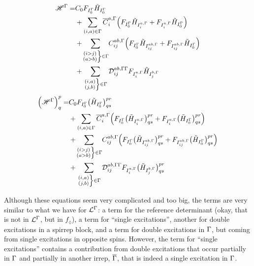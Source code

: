 \begin{equation}
  \begin{split}
    \bigH^\irp = &
    C_0 F_{I_0^\irp} \tilde{H}_{I_0^\irp}\\
    & + \sum_{(i,a) \in \irp} \overline{C}_i^{a,\irp}
    \Big(
        F_{I_0^\irp} \tilde{H}_{I_{i}^{a,\irp}}
        + F_{I_{i}^{a,\irp}} \tilde{H}_{I_0^\irp}
    \Big)\\
    & + \sumijabrestr C_{ij}^{ab, \irp}
    \Big(
        F_{I_0^\irp} \tilde{H}_{I_{ij}^{ab,\irp}}
        + F_{I_{ij}^{ab,\irp}} \tilde{H}_{I_0^\irp}
    \Big)\\
    & + \sumijabfull \Dmix_{ij}^{ab, \irp\irp}
    F_{I_i^{a,\irp}} \tilde{H}_{I_j^{b,\irp}}
  \end{split}
\end{equation}
\begin{equation}
  \begin{split}
    \Big( \bigH^\irp \Big)^p_q = &
    C_0 F_{I_0^\irp} \big( \tilde{H}_{I_0^\irp} \big)^{pr}_{qs}\\
    & + \sum_{(i,a) \in \irp} \overline{C}_i^{a,\irp}
    \Big(
        F_{I_0^\irp} \big( \tilde{H}_{I_{i}^{a,\irp}} \big)^{pr}_{qs}
        + F_{I_{i}^{a,\irp}} \big( \tilde{H}_{I_0^\irp} \big)^{pr}_{qs}
    \Big)\\
    & + \sumijabrestr C_{ij}^{ab, \irp}
    \Big(
        F_{I_0^\irp} \big( \tilde{H}_{I_{ij}^{ab,\irp}} \big)^{pr}_{qs}
        + F_{I_{ij}^{ab,\irp}} \big( \tilde{H}_{I_0^\irp} \big)^{pr}_{qs}
    \Big)\\
    & + \sumijabfull \Dmix_{ij}^{ab, \irp\irp}
    F_{I_i^{a,\irp}} \big( \tilde{H}_{I_j^{b,\irp}} \big)^{pr}_{qs}
  \end{split}
\end{equation}

Although these equations seem very complicated and too big, the terms are very similar to what we have for $\mathcal{L}^{\Gamma}$:
a term for the reference determinant (okay, that is not in $\mathcal{L}^{\Gamma}$, but in $f_\lozenge$), a term for ``single excitations'', another for double excitations in a spirrep block, and a term for double excitations in $\Gamma$, but coming from single excitations in opposite spins.
However, the term for ``single excitations'' contains a contribution from double excitations that occur partially in $\Gamma$ and partially in another irrep, ${\overline{\Gamma}}$, that is indeed a single excitation in $\Gamma$.


